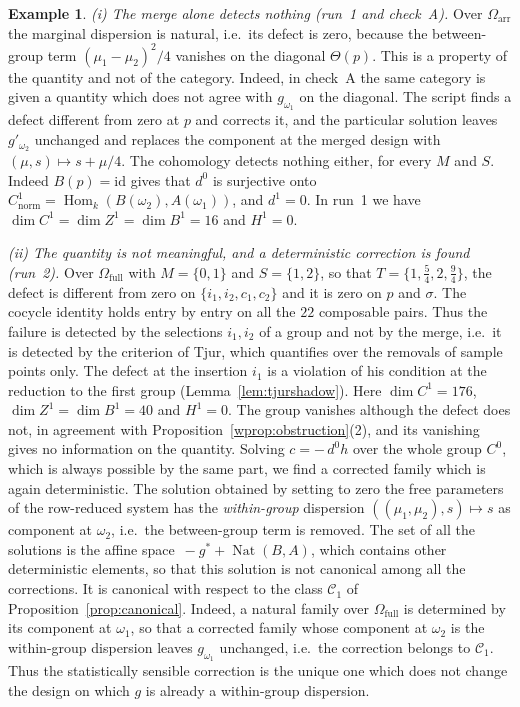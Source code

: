 \documentclass[11pt,a4paper]{article}
\theoremstyle{plain}
\theoremstyle{definition}
\newtheorem{example}[theorem]{Example}
\theoremstyle{remark}
\newcommand{\cat}[1]{\mathsf{#1}}
\newcommand{\catO}{\cat{\Omega}}
\newcommand{\id}{\mathrm{id}}
\DeclareMathOperator{\Nat}{Nat}
\DeclareMathOperator{\Hom}{Hom}
\begin{document}
\begin{example}\label{ex:oneway-findings}
\emph{(i) The merge alone detects nothing (run~1 and check~A).} Over
$\catO_{\mathrm{arr}}$ the marginal dispersion is natural, i.e.\ its defect
is zero, because the between-group term $(\mu_1-\mu_2)^2/4$ vanishes on the
diagonal $\Theta(p)$. This is a property of the quantity and not of the
category. Indeed, in check~A the same category is given a quantity which does
not agree with $g_{\omega_1}$ on the diagonal. The script finds a defect
different from zero at $p$ and corrects it, and the particular solution leaves
$g'_{\omega_2}$ unchanged and replaces the component at the merged design with
$(\mu,s) \mapsto s + \mu/4$. The cohomology detects nothing either, for every
$M$ and $S$. Indeed $B(p) = \id$ gives that $d^{0}$ is surjective onto
$C^{1}_{\mathrm{norm}} = \Hom_k(B(\omega_2),A(\omega_1))$, and $d^{1} = 0$. In
run~1 we have $\dim C^{1} = \dim Z^{1} = \dim B^{1} = 16$ and $H^{1} = 0$.

\emph{(ii) The quantity is not meaningful, and a deterministic correction is
found (run~2).} Over $\catO_{\mathrm{full}}$ with $M = \{0,1\}$ and
$S = \{1,2\}$, so that $T = \{1,\tfrac54,2,\tfrac94\}$, the defect is
different from zero on $\{i_1,i_2,c_1,c_2\}$ and it is zero on $p$ and
$\sigma$. The cocycle identity holds entry by entry on all the $22$ composable
pairs. Thus the failure is detected by the selections $i_1, i_2$ of a group and
not by the merge, i.e.\ it is detected by the criterion of Tjur, which
quantifies over the removals of sample points only. The defect at the
insertion $i_1$ is a violation of his condition at the reduction to the first
group (Lemma~\ref{lem:tjurshadow}). Here $\dim C^{1} = 176$,
$\dim Z^{1} = \dim B^{1} = 40$ and $H^{1} = 0$. The group vanishes although the
defect does not, in agreement with Proposition~\ref{wprop:obstruction}(2), and
its vanishing gives no information on the quantity. Solving $c = -\,d^{0}h$
over the whole group $C^{0}$, which is always possible by the same part, we
find a corrected family which is again deterministic. The solution obtained by
setting to zero the free parameters of the row-reduced system has the
\emph{within-group} dispersion $((\mu_1,\mu_2),s) \mapsto s$ as component at
$\omega_2$, i.e.\ the between-group term is removed. The set of all the
solutions is the affine space $\,-g^{*} + \Nat(B, A)$, which contains other
deterministic elements, so that this solution is not canonical among all the
corrections. It is canonical with respect to the class $\mathcal{C}_{1}$ of
Proposition~\ref{prop:canonical}. Indeed, a natural family over
$\catO_{\mathrm{full}}$ is determined by its component at $\omega_1$, so that a
corrected family whose component at $\omega_2$ is the within-group dispersion
leaves $g_{\omega_1}$ unchanged, i.e.\ the correction belongs to
$\mathcal{C}_{1}$. Thus the statistically sensible correction is the unique
one which does not change the design on which $g$ is already a within-group
dispersion.


\end{example}
\end{document}
